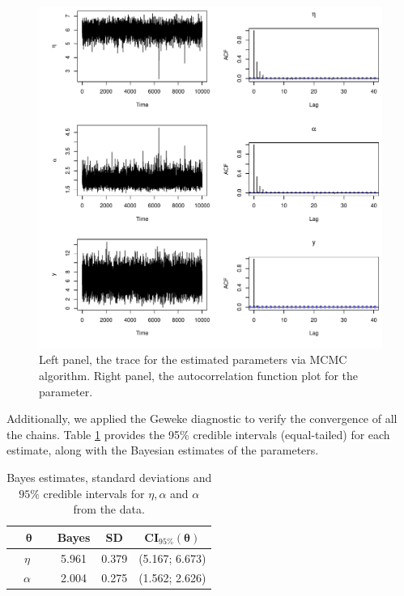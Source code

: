 \documentclass[12pt]{interact}
\theoremstyle{plain}%
\theoremstyle{definition}
\theoremstyle{remark}
\begin{document}
\begin{figure}[!h]
\centering
\includegraphics[scale=0.6]{tsplot.pdf}
\caption{ Left panel, the trace for the estimated parameters via MCMC algorithm. Right panel, the autocorrelation function plot for the parameter.}
\label{graf3}
\end{figure}


Additionally, we applied the Geweke diagnostic to verify the convergence of all the chains. Table \ref{tablem2} provides the 95\% credible intervals (equal-tailed) for each estimate, along with the Bayesian estimates of the parameters.
\begin{table}[!ht]
\caption{Bayes estimates, standard deviations and $95\%$ credible intervals for $\eta,\alpha$ and $\alpha$ from the data.}
\centering %
\begin{center}
  \begin{tabular}{ c | c | c | c}
    \hline
		$\boldsymbol{\theta}$  & Bayes & SD & CI$_{95\%}(\boldsymbol{\theta})$ \\ \hline
    \ \ $\eta$ \ \   & 5.961 & 0.379  & (5.167; 6.673) \\ \hline
    \ \ $\alpha$   \ \  & 2.004 & 0.275  & (1.562; 2.626) \\ \hline
  \end{tabular}\label{tablem2}
\end{center}
\end{table}
\end{document}
